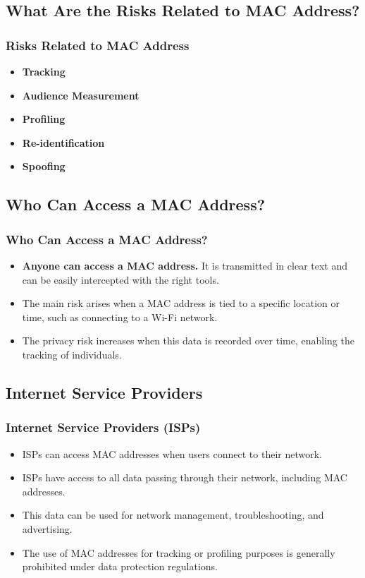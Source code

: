 \documentclass[
english,
svgnames,
notes=hide,
12pt]{beamer}
\begin{document}
\begin{frame}
  \section{What Are the Risks Related to MAC Address?}
  \frametitle{Risks Related to MAC Address}
  \begin{itemize}
    \item \textbf{Tracking} \pause
    \item \textbf{Audience Measurement} \pause
    \item \textbf{Profiling} \pause
    \item \textbf{Re-identification} \pause
    \item \textbf{Spoofing} 
  \end{itemize}
\end{frame}

\begin{frame}
  \section{Who Can Access a MAC Address?}
  \frametitle{Who Can Access a MAC Address?}
  \begin{itemize}
    \item \textbf{Anyone can access a MAC address.} It is transmitted in clear text and can be easily intercepted with the right tools. \pause
    \item The main risk arises when a MAC address is tied to a specific location or time, such as connecting to a Wi-Fi network. \pause
    \item The privacy risk increases when this data is recorded over time, enabling the tracking of individuals. 
  \end{itemize}
\end{frame}

\begin{frame}
  \section{Internet Service Providers}
  \frametitle{Internet Service Providers (ISPs)}
  \begin{itemize}
    \item ISPs can access MAC addresses when users connect to their network. \pause
    \item ISPs have access to all data passing through their network, including MAC addresses. \pause
    \item This data can be used for network management, troubleshooting, and advertising. \pause
    \item The use of MAC addresses for tracking or profiling purposes is generally prohibited under data protection regulations. 
  \end{itemize}
\end{frame}
\end{document}
